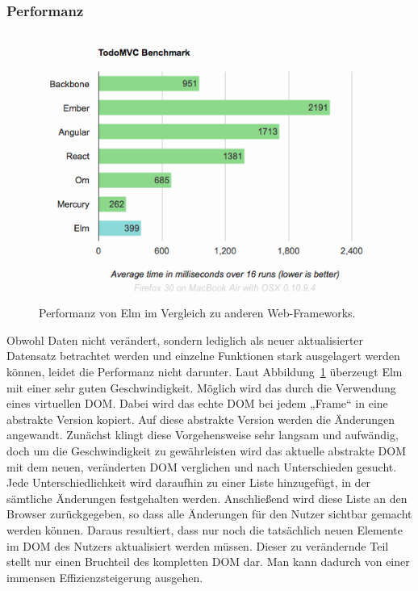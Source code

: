 \subsubsection{Performanz}
\label{sec:Performanz}
\begin{figure}[hb]
  \centering  
  \includegraphics[scale=0.6]{img/virtual-dom.png}
  \caption{Performanz von Elm im Vergleich zu anderen Web-Frameworks. \cite{elm-performance}}\label{fig:performance}
\end{figure}
Obwohl Daten nicht verändert, sondern lediglich als neuer aktualisierter Datensatz betrachtet werden und einzelne Funktionen stark ausgelagert werden können, leidet die Performanz nicht darunter. Laut Abbildung~\ref{fig:performance} überzeugt Elm mit einer sehr guten Geschwindigkeit. Möglich wird das durch die Verwendung eines virtuellen \ac{DOM}.
Dabei wird das echte \ac{DOM} bei jedem „Frame“ in eine abstrakte Version kopiert. Auf diese abstrakte Version werden die Änderungen angewandt. Zunächst klingt diese Vorgehensweise sehr langsam und aufwändig, doch um die Geschwindigkeit zu gewährleisten wird das aktuelle abstrakte \ac{DOM} mit dem neuen, veränderten \ac{DOM} verglichen und nach Unterschieden gesucht. Jede Unterschiedlichkeit wird daraufhin zu einer Liste hinzugefügt, in der sämtliche Änderungen festgehalten werden. Anschließend wird diese Liste an den Browser zurückgegeben, so dass alle Änderungen für den Nutzer sichtbar gemacht werden können. Daraus resultiert, dass nur noch die tatsächlich neuen Elemente im \ac{DOM} des Nutzers aktualisiert werden müssen. Dieser zu verändernde Teil stellt nur einen Bruchteil des kompletten \ac{DOM} dar. Man kann dadurch von einer immensen Effizienzsteigerung ausgehen.


